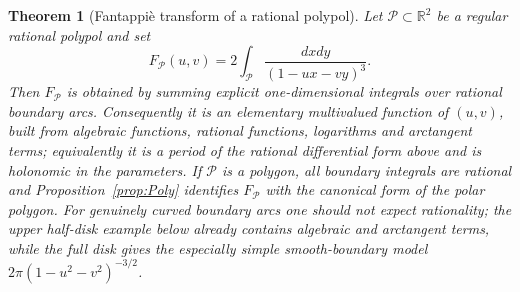 \documentclass[10pt,a4paper]{amsart}
\newtheorem{theorem}{Theorem}
\newcommand {\bR} {\mathbb R}
\newcommand {\cP} {\mathcal P}
\begin{document}
\begin{theorem}[Fantappi\`e transform of a rational polypol]\label{th:GenFucnt}
Let $\cP\subset\bR^2$ be a regular rational polypol and set
$$
F_{\cP}(u,v)=2\int_{\cP}\frac{dxdy}{(1-ux-vy)^3}.
$$
Then $F_{\cP}$ is obtained by summing explicit one-dimensional integrals over rational boundary arcs.  Consequently it is an elementary multivalued function of $(u,v)$, built from algebraic functions, rational functions, logarithms and arctangent terms; equivalently it is a period of the rational differential form above and is holonomic in the parameters.  If $\cP$ is a polygon, all boundary integrals are rational and Proposition~\ref{prop:Poly} identifies $F_{\cP}$ with the canonical form of the polar polygon.  For genuinely curved boundary arcs one should not expect rationality; the upper half-disk example below already contains algebraic and arctangent terms, while the full disk gives the especially simple smooth-boundary model $2\pi(1-u^2-v^2)^{-3/2}$.
\end{theorem}
\end{document}
